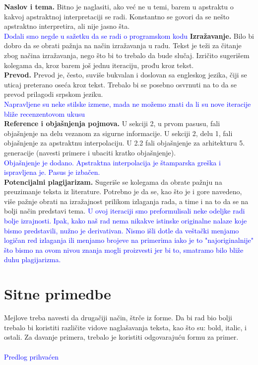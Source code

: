 \documentclass[a4paper]{report}
\newcommand{\odgovor}[1]{\textcolor{blue}{#1}}
\begin{document}
\textbf{Naslov i tema.} Bitno je naglasiti, ako već ne u temi, barem u apstraktu o kakvoj apstraktnoj interpretaciji se radi. Konstantno se govori da se nešto apstraktno interpretira, ali nije jasno šta.\\ 
\odgovor{Dodali smo negde u sažetku da se radi o programskom kodu}
\textbf{Izražavanje.} Bilo bi dobro da se obrati pažnja na način izražavanja u radu. Tekst je teži za čitanje zbog načina izražavanja, nego što bi to trebalo da bude slučaj. Izričito sugerišem kolegama da, kroz barem još jednu iteraciju, prođu kroz tekst.\\ 
\textbf{Prevod.} Prevod je, često, suviše bukvalan i doslovan sa engleskog jezika, čiji se uticaj preterano oseća kroz tekst. Trebalo bi se posebno osvrnuti na to da se prevod prilagodi srpskom jeziku.\\
\odgovor{Napravljene su neke stilske izmene, mada ne možemo znati da li su nove iteracije bliže recenzentovom ukusu}
\\
\textbf{Reference i objašnjenja pojmova.} U sekciji 2, u prvom pasusu, fali objašnjenje na delu vezanom za sigurne informacije. U sekciji 2, delu 1, fali objašnjenje za apstraktnu interpolaciju. U 2.2 fali objašnjenje za arhitekturu 5. generacije (navesti primere i ubaciti kratko objašnjenje).\\
\odgovor{Objašnjenje je dodano. Apstraktna interpolacija je štamparska greška i ispravljena je. Pasus je izbačen.}
\\
\textbf{Potencijalni plagijarizam.} Sugeriše se kolegama da obrate pažnju na preuzimanje teksta iz literature. Potrebno je da se, kao što je i gore navedeno, više pažnje obrati na izražajnost prilikom izlaganja rada, a time i na to da se na bolji način predstavi tema.
\odgovor{U ovoj iteraciji smo preformulisali neke odeljke radi bolje izrajnosti. Ipak, kako naš rad nema nikakve istinske originalne nalaze koje bismo predstavili, nužno je derivativan. Nismo išli dotle da veštački menjamo logičan red izlaganja ili menjamo brojeve na primerima iako je to "najoriginalnije" što bismo na ovom nivou znanja mogli proizvesti jer bi to, smatramo bilo bliže duhu plagijarizma.}

\section{Sitne primedbe}
Mejlove treba navesti da drugačiji način, štrče iz forme.
Da bi rad bio bolji trebalo bi koristiti različite vidove naglašavanja teksta, kao što su: bold, italic, i ostali. Za davanje primera, trebalo je koristiti odgovarajuću formu za primer.\\
\\
\odgovor{Predlog prihvaćen}
\end{document}
